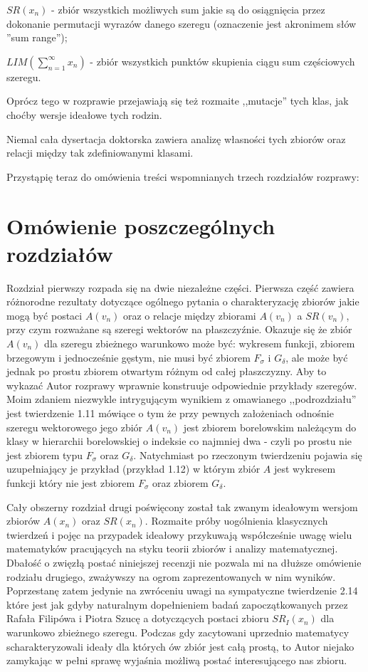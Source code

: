 \documentclass[12pt]{article}
\begin{document}
$SR(x_n)$ - zbiór wszystkich możliwych sum jakie są
do osiągnięcia przez dokonanie permutacji wyrazów
danego szeregu (oznaczenie jest akronimem słów 
''sum range'');

$LIM(\sum_{n=1}^\infty x_n)$ - zbiór wszystkich punktów
skupienia ciągu sum częściowych szeregu.

  Oprócz tego w rozprawie przejawiają się też rozmaite ,,mutacje''
tych klas, jak choćby wersje ideałowe tych rodzin.
  
  Niemal cała dysertacja doktorska zawiera analizę
własności tych zbiorów oraz relacji między tak zdefiniowanymi
klasami.
  

  Przystąpię teraz do omówienia treści wspomnianych trzech rozdziałów rozprawy:

\section{Omówienie poszczególnych rozdziałów}

Rozdział pierwszy rozpada się na dwie niezależne części.
Pierwsza część zawiera różnorodne rezultaty dotyczące ogólnego
pytania o charakteryzację zbiorów jakie mogą być postaci $A(v_n)$
oraz o relacje między zbiorami $A(v_n)$ a $SR(v_n)$, przy czym
rozważane są szeregi wektorów na płaszczyźnie.
Okazuje się że zbiór $A(v_n)$ dla szeregu zbieżnego warunkowo 
może być: wykresem funkcji,
zbiorem brzegowym i jednocześnie gęstym, nie musi być zbiorem
$F_\sigma$ i $G_\delta$, ale może być jednak po prostu zbiorem
otwartym różnym od całej płaszczyzny. Aby to wykazać Autor rozprawy 
wprawnie konstruuje odpowiednie przykłady szeregów. Moim zdaniem niezwykle
intrygującym wynikiem z omawianego ,,podrozdziału'' jest twierdzenie
1.11 mówiące o tym że przy pewnych założeniach odnośnie szeregu
wektorowego jego zbiór $A(v_n)$ jest zbiorem borelowskim należącym
do klasy w hierarchii borelowskiej o indeksie co najmniej dwa -
czyli po prostu nie jest zbiorem typu $F_\sigma$ oraz
$G_\delta$. Natychmiast po rzeczonym twierdzeniu pojawia się uzupełniający
je przykład (przykład 1.12) w którym zbiór $A$ jest wykresem funkcji 
który nie jest zbiorem $F_\sigma$ oraz zbiorem $G_\delta$. 
    
  Cały obszerny rozdział drugi poświęcony został 
tak zwanym ideałowym wersjom zbiorów $A(x_n)$ oraz
$SR(x_n)$. Rozmaite próby uogólnienia klasycznych twierdzeń
i pojęc na przypadek ideałowy przykuwają współcześnie
uwagę wielu matematyków pracujących na styku teorii zbiorów 
i analizy matematycznej. Dbałość o zwięzłą postać niniejszej
recenzji nie pozwala mi na dłuższe omówienie rodziału drugiego,
zważywszy na ogrom zaprezentowanych w nim wyników. Poprzestanę zatem
jedynie na zwróceniu uwagi na sympatyczne twierdzenie 2.14 które 
jest jak gdyby naturalnym dopełnieniem badań zapoczątkowanych
przez Rafała Filipówa i Piotra Szucę a dotyczących 
postaci zbioru $SR_I(x_n)$ dla warunkowo zbieżnego szeregu.
Podczas gdy zacytowani uprzednio matematycy scharakteryzowali
ideały dla których ów zbiór jest całą prostą, to
Autor niejako zamykając w pełni sprawę wyjaśnia możliwą
postać interesującego nas zbioru.
  
\end{document}
